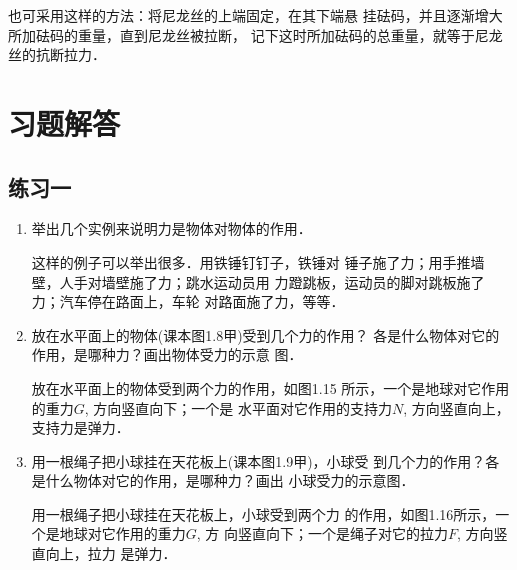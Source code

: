也可采用这样的方法：将尼龙丝的上端固定，在其下端悬
挂砝码，并且逐渐增大所加砝码的重量，直到尼龙丝被拉断，
记下这时所加砝码的总重量，就等于尼龙丝的抗断拉力．

\section{习题解答}

\subsection{练习一}
\begin{enumerate}
\item  举出几个实例来说明力是物体对物体的作用．

\begin{solution}
    这样的例子可以举出很多．用铁锤钉钉子，铁锤对
锤子施了力；用手推墙壁，人手对墙壁施了力；跳水运动员用
力蹬跳板，运动员的脚对跳板施了力；汽车停在路面上，车轮
对路面施了力，等等．
\end{solution}
\item 放在水平面上的物体(课本图1.8甲)受到几个力的作用？
  各是什么物体对它的作用，是哪种力？画出物体受力的示意
  图．

  \begin{solution}
    放在水平面上的物体受到两个力的作用，如图1.15
    所示，一个是地球对它作用的重力$G$, 方向竖直向下；一个是
    水平面对它作用的支持力$N$, 方向竖直向上，支持力是弹力．
  \end{solution}
\item 用一根绳子把小球挂在天花板上(课本图1.9甲)，小球受
  到几个力的作用？各是什么物体对它的作用，是哪种力？画出
  小球受力的示意图．

  \begin{solution}
    用一根绳子把小球挂在天花板上，小球受到两个力
    的作用，如图1.16所示，一个是地球对它作用的重力$G$, 方
    向竖直向下；一个是绳子对它的拉力$F$, 方向竖直向上，拉力
    是弹力．
  \end{solution}


\end{enumerate}
